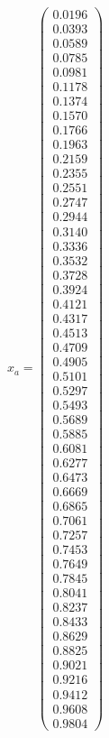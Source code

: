 \documentclass{udpreport}
\begin{document}
\begin{enumerate}
\begin{enumerate}
{{{{\begin{itemize}
					$x_{a} = \left(\begin{array}{c} 0.0196\\ 0.0393\\ 0.0589\\ 0.0785\\ 0.0981\\ 0.1178\\ 0.1374\\ 0.1570\\ 0.1766\\ 0.1963\\ 0.2159\\ 0.2355\\ 0.2551\\ 0.2747\\ 0.2944\\ 0.3140\\ 0.3336\\ 0.3532\\ 0.3728\\ 0.3924\\ 0.4121\\ 0.4317\\ 0.4513\\ 0.4709\\ 0.4905\\ 0.5101\\ 0.5297\\ 0.5493\\ 0.5689\\ 0.5885\\ 0.6081\\ 0.6277\\ 0.6473\\ 0.6669\\ 0.6865\\ 0.7061\\ 0.7257\\ 0.7453\\ 0.7649\\ 0.7845\\ 0.8041\\ 0.8237\\ 0.8433\\ 0.8629\\ 0.8825\\ 0.9021\\ 0.9216\\ 0.9412\\ 0.9608\\ 0.9804 \end{array}\right)$
										

\end{itemize}}}}}
\end{enumerate}
\end{enumerate}
\end{document}
